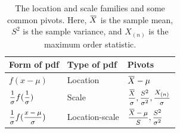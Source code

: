 \begin{table}[h!]
\centering
\renewcommand{\arraystretch}{1.2}
\begin{tabularx}{0.45\paperwidth}{p{2.5cm} p{2.5cm} p{3cm}}
    \toprule
    Form of pdf & Type of pdf & Pivots \\[0.6em]
    \midrule
    $f(x - \mu)$ & Location & $\ols{X} - \mu$\\[0.6em]
    $\mfrac{1}{\sigma} f(\mfrac{1}{\sigma})$ & Scale & $\mfrac{\ols{X}}{\sigma}, \mfrac{S^2}{\sigma^2}, \mfrac{X_{(n)}}{\sigma}$\\[0.6em]
    $\mfrac{1}{\sigma} f(\mfrac{x - \mu}{\sigma})$ & Location-scale & $\mfrac{\ols{X} - \mu}{S}, \mfrac{S^2}{\sigma^2}$\\[0.6em]
    \bottomrule
\end{tabularx}
\caption{The location and scale families and some common pivots. Here, $\ols{X}$ is the sample mean, $S^2$ is the sample variance, and $X_{(n)}$ is the maximum order statistic.}
\end{table}

